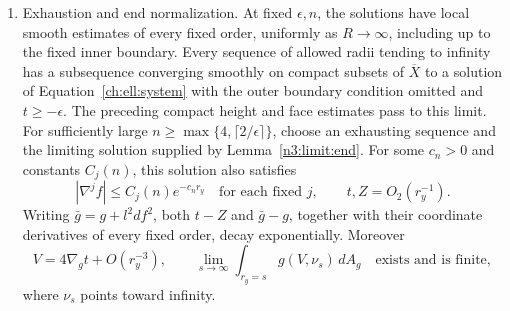 \begin{proposition}
\begin{enumerate}
\item \textup{Exhaustion and end normalization.}
At fixed $\epsilon,n$, the solutions have local smooth estimates of
every fixed order, uniformly as $R\to\infty$, including up to the
fixed inner boundary.  Every sequence of allowed radii tending to
infinity has a subsequence converging smoothly on compact subsets of
$\overline X$ to a solution of Equation~\eqref{ch:ell:system} with
the outer boundary condition omitted and $t\ge-\epsilon$.
The preceding compact height and face estimates pass to this limit.
For sufficiently large $n\ge\max\{4,\lceil2/\epsilon\rceil\}$,
choose an exhausting sequence and the limiting solution supplied by
Lemma~\ref{n3:limit:end}.  For some $c_n>0$ and constants $C_j(n)$,
this solution also satisfies
\begin{equation}\label{ch:ell:end-estimates}
 |\nabla^jf|\le C_j(n)e^{-c_nr_y}\quad\text{for each fixed }j,
 \qquad t,Z=O_2(r_y^{-1}).
\end{equation}
Writing $\bar g=g+l^2df^2$, both $t-Z$ and $\bar g-g$, together
with their coordinate derivatives of every fixed order, decay
exponentially.  Moreover
\begin{equation}\label{ch:ell:end-flux}
 V=4\nabla_gt+O(r_y^{-3}),\qquad
 \lim_{s\to\infty}\int_{r_y=s}g(V,\nu_s)\,dA_g
 \quad\text{exists and is finite},
\end{equation}
where $\nu_s$ points toward infinity.
\end{enumerate}
\end{proposition}

